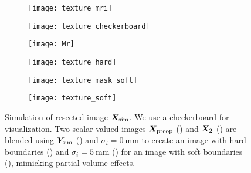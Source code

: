 \begin{figure}
  \centering
  \captionsetup[subfigure]{aboveskip=3pt, belowskip=5pt}

  \begin{subfigure}{0.15\textwidth}
    \texttt{[image: texture\_mri]}
    \caption{\label{fig:tmri}}
  \end{subfigure}
  \begin{subfigure}{0.15\textwidth}
    \texttt{[image: texture\_checkerboard]}
    \caption{\label{fig:checkerboard}}
  \end{subfigure}
  \begin{subfigure}{0.15\textwidth}
    \texttt{[image: Mr]}
    \caption{\label{fig:tmh}}
  \end{subfigure}
  \begin{subfigure}{0.15\textwidth}
    \texttt{[image: texture\_hard]}
    \caption{\label{fig:blh}}
  \end{subfigure}
  \begin{subfigure}{0.15\textwidth}
    \texttt{[image: texture\_mask\_soft]}
    \caption{\label{fig:tms}}
  \end{subfigure}
  \begin{subfigure}{0.15\textwidth}
    \texttt{[image: texture\_soft]}
    \caption{\label{fig:bls}}
  \end{subfigure}

  \caption[Simulation of resected image using alpha blending]{
    Simulation of resected image $\bm{X}_{\text{sim}}$.
    We use a checkerboard for visualization.
    Two scalar-valued images $\bm{X}_{\text{preop}}$ ()
    and $\bm{X}_2$ ()
    are blended using $\bm{Y}_{\text{sim}}$ ()
    and $\sigma_i = \SI{0}{\milli \meter}$ to create an image with hard boundaries ()
    and $\sigma_i = \SI{5}{\milli \meter}$ ()
    for an image with soft boundaries (),
    mimicking partial-volume effects.
  }
  \label{fig:texture}
\end{figure}
